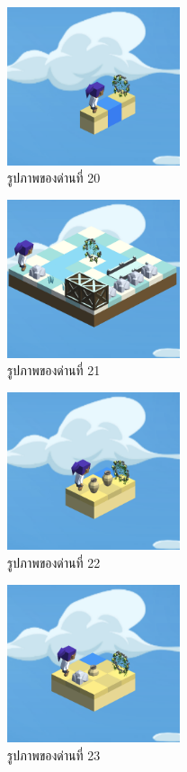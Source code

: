 \begin{figure}[H]
    \begin{center}
    \includegraphics[width=2in]{pic-toro/stage/s20.png}
    \end{center}
    \caption[รูปภาพของด่านที่ 20]{รูปภาพของด่านที่ 20}
    \label{s20}
\end{figure}
\begin{figure}[H]
    \begin{center}
    \includegraphics[width=2in]{pic-toro/stage/s21.png}
    \end{center}
    \caption[รูปภาพของด่านที่ 21]{รูปภาพของด่านที่ 21}
    \label{s21}
\end{figure}
\begin{figure}[H]
    \begin{center}
    \includegraphics[width=2in]{pic-toro/stage/s22.png}
    \end{center}
    \caption[รูปภาพของด่านที่ 22]{รูปภาพของด่านที่ 22}
    \label{s22}
\end{figure}
\begin{figure}[H]
    \begin{center}
    \includegraphics[width=2in]{pic-toro/stage/s23.png}
    \end{center}
    \caption[รูปภาพของด่านที่ 23]{รูปภาพของด่านที่ 23}
    \label{s23}
\end{figure}
